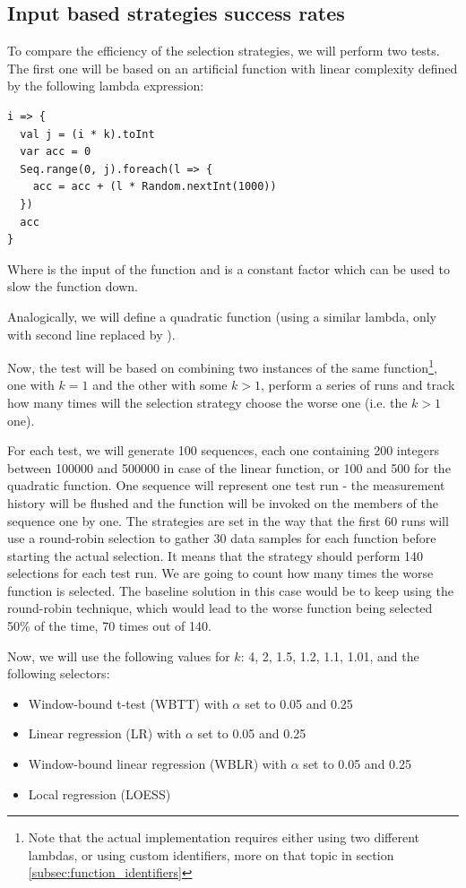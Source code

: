 \subsection{Input based strategies success rates}
\label{subsec:input_based_strategies_success}

To compare the efficiency of the selection strategies, we will perform two tests. The first one will be based on an artificial function with linear complexity defined by the following lambda expression:

\lstset{style=Scala}
\begin{lstlisting}
i => {
  val j = (i * k).toInt
  var acc = 0
  Seq.range(0, j).foreach(l => {
    acc = acc + (l * Random.nextInt(1000))
  })
  acc
}
\end{lstlisting}

Where  is the input of the function and  is a constant factor which can be used to slow the function down.

Analogically, we will define a quadratic function (using a similar lambda, only with second line replaced by ).

Now, the test will be based on combining two instances of the same function\footnote{Note that the actual implementation requires either using two different lambdas, or using custom identifiers, more on that topic in section \ref{subsec:function_identifiers}}, one with $k=1$ and the other with some $k>1$, perform a series of runs and track how many times will the selection strategy choose the worse one (i.e. the $k>1$ one).

For each test, we will generate 100 sequences, each one containing 200 integers between 100000 and 500000 in case of the linear function, or 100 and 500 for the quadratic function. One sequence will represent one test run - the measurement history will be flushed and the function will be invoked on the members of the sequence one by one. The strategies are set in the way that the first 60 runs will use a round-robin selection to gather 30 data samples for each function before starting the actual selection. It means that the strategy should perform 140 selections for each test run. We are going to count how many times the worse function is selected. The baseline solution in this case would be to keep using the round-robin technique, which would lead to the worse function being selected 50\% of the time, 70 times out of 140.

Now, we will use the following values for $k$: 4, 2, 1.5, 1.2, 1.1, 1.01, and the following selectors:
\begin{itemize}
	\item Window-bound t-test (WBTT) with $\alpha$ set to 0.05 and 0.25
	\item Linear regression (LR) with $\alpha$ set to 0.05 and 0.25
	\item Window-bound linear regression (WBLR) with $\alpha$ set to 0.05 and 0.25
	\item Local regression (LOESS)
\end{itemize}

